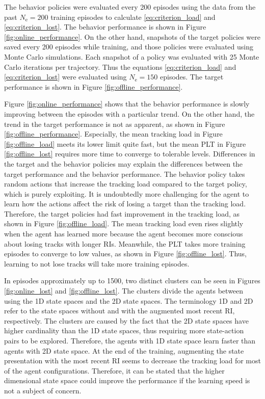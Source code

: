 \documentclass[english, 12pt, a4paper, elec, utf8, a-1b, online]{aaltothesis}
\numberwithin{equation}{section}
\newcommand{\Ne}{N_\text{e}}
\begin{document}
The behavior policies were evaluated every 200 episodes using the data from the past $\Ne=200$ training episodes to calculate \eqref{eq:criterion_load} and \eqref{eq:criterion_lost}.
The behavior performance is shown in Figure \ref{fig:online_performance}.
On the other hand, snapshots of the target policies were saved every 200 episodes while training, and those policies were evaluated using Monte Carlo simulations.
Each snapshot of a policy was evaluated with 25 Monte Carlo iterations per trajectory.
Thus the equations \eqref{eq:criterion_load} and \eqref{eq:criterion_lost} were evaluated using $\Ne=150$ episodes.
The target performance is shown in Figure \ref{fig:offline_performance}.


Figure \ref{fig:online_performance} shows that the behavior performance is slowly improving between the episodes with a particular trend.
On the other hand, the trend in the target performance is not as apparent, as shown in Figure \ref{fig:offline_performance}.
Especially, the mean tracking load in Figure \ref{fig:offline_load} meets its lower limit quite fast, but the mean PLT in Figure \ref{fig:offline_lost} requires more time to converge to tolerable levels.
Differences in the target and the behavior policies may explain the differences between the target performance and the behavior performance.
The behavior policy takes random actions that increase the tracking load compared to the target policy, which is purely exploiting.
It is undoubtedly more challenging for the agent to learn how the actions affect the risk of losing a target than the tracking load.
Therefore, the target policies had fast improvement in the tracking load, as shown in Figure \ref{fig:offline_load}. 
The mean tracking load even rises slightly when the agent has learned more because the agent becomes more conscious about losing tracks with longer RIs.
Meanwhile, the PLT takes more training episodes to converge to low values, as shown in Figure \ref{fig:offline_lost}.
Thus, learning to not lose tracks will take more training episodes.


In episodes approximately up to 1500, two distinct clusters can be seen in Figures \ref{fig:online_lost} and \ref{fig:offline_lost}.
The clusters divide the agents between using the 1D state spaces and the 2D state spaces.
The terminology 1D and 2D refer to the state spaces without and with the augmented most recent RI, respectively.
The clusters are caused by the fact that the 2D state spaces have higher cardinality than the 1D state spaces, thus requiring more state-action pairs to be explored.
Therefore, the agents with 1D state space learn faster than agents with 2D state space.
At the end of the training, augmenting the state presentation with the most recent RI seems to decrease the tracking load for most of the agent configurations. 
Therefore, it can be stated that the higher dimensional state space could improve the performance if the learning speed is not a subject of concern.
\end{document}
